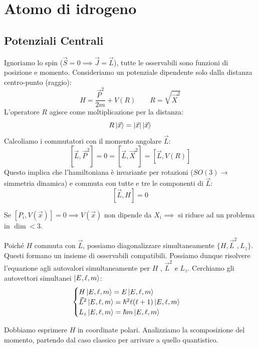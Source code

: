 \chapter{Atomo di idrogeno}


\section{Potenziali Centrali}

Ignoriamo lo spin (\( \vec{S}=0 \implies \vec{J}=\vec{L} \)), tutte le osservabili sono funzioni di posizione e momento. Consideriamo un potenziale dipendente solo dalla distanza centro-punto (raggio):
\[
H = \frac{\vec{P}^2}{2m} + V(R) \qquad R = \sqrt{\vec{X}^2}
\]
L'operatore \( R \) agisce come moltiplicazione per la distanza:
\[
R\ket{\vec{x}} = \abs{\vec{x}}\ket{\vec{x}}
\]
Calcoliamo i commutatori con il momento angolare \( \vec{L} \):
\[
[\vec{L}, \vec{P}^2] = 0 = [\vec{L}, \vec{X}^2] = [\vec{L}, V(R)]
\]
Questo implica che l'hamiltoniana è invariante per rotazioni (\( SO(3) \to \) simmetria dinamica) e commuta con tutte e tre le componenti di \( \vec{L} \):
\[
[\vec{L}, H] = 0
\]

\begin{remark}
    Se \([P_i, V(\vec{x})] = 0 \implies V(\vec{x})\) non dipende da \( X_i \implies \) si riduce ad un problema in \(\dim < 3\).
\end{remark}

Poiché \( H \) commuta con \( \vec{L} \), possiamo diagonalizzare simultaneamente \( \{H, \vec{L}^2, L_z\} \). Questi formano un insieme di osservabili compatibili.
Possiamo dunque risolvere l'equazione agli autovalori simultaneamente per \( H \) , \( \vec{L}^2 \) e \(L_z\). Cerchiamo gli autovettori simultanei \( \ket{E, \ell, m} \):
\begin{equation}
    \label{eq: potCentrali}
    \begin{cases}
        H\ket{E,\ell,m} = E\ket{E,\ell,m} \\
        \vec{L}^2\ket{E,\ell,m} = \hbar^2 \ell(\ell+1)\ket{E,\ell,m} \\
        L_z\ket{E,\ell,m} = \hbar m\ket{E,\ell,m}
    \end{cases}
\end{equation}

Dobbiamo esprimere \( H \) in coordinate polari. Analizziamo la scomposizione del momento, partendo dal caso classico per arrivare a quello quantistico.
